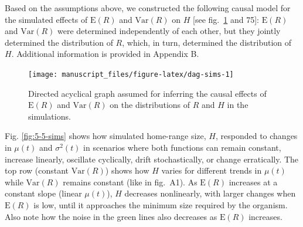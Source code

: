 \documentclass[
  12pt,
]{article}
\begin{document}
Based on the assumptions above, we constructed the following causal model for the simulated effects of \(\text{E}(R)\) and \(\text{Var}(R)\) on \(H\) {[}see fig.~\ref{fig:dag-sims} and 75{]}: \(\text{E}(R)\) and \(\text{Var}(R)\) were determined independently of each other, but they jointly determined the distribution of \(R\), which, in turn, determined the distribution of \(H\). Additional information is provided in Appendix B.

\begin{figure}

{\centering \texttt{[image: manuscript\_files/figure-latex/dag-sims-1]} 

}

\caption{Directed acyclical graph assumed for inferring the causal effects of $\text{E}(R)$ and $\text{Var}(R)$ on the distributions of $R$ and $H$ in the simulations.}\label{fig:dag-sims}
\end{figure}

Fig. \ref{fig:5-5-sims} shows how simulated home-range size, \(H\), responded to changes in \(\mu(t)\) and \(\sigma^2(t)\) in scenarios where both functions can remain constant, increase linearly, oscillate cyclically, drift stochastically, or change erratically. The top row (constant \(\text{Var}(R)\)) shows how \(H\) varies for different trends in \(\mu(t)\) while \(\text{Var}(R)\) remains constant (like in fig.~A1). As \(\text{E}(R)\) increases at a constant slope (linear \(\mu(t)\)), \(H\) decreases nonlinearly, with larger changes when \(\text{E}(R)\) is low, until it approaches the minimum size required by the organism. Also note how the noise in the green lines also decreases as \(\text{E}(R)\) increases.
\end{document}
